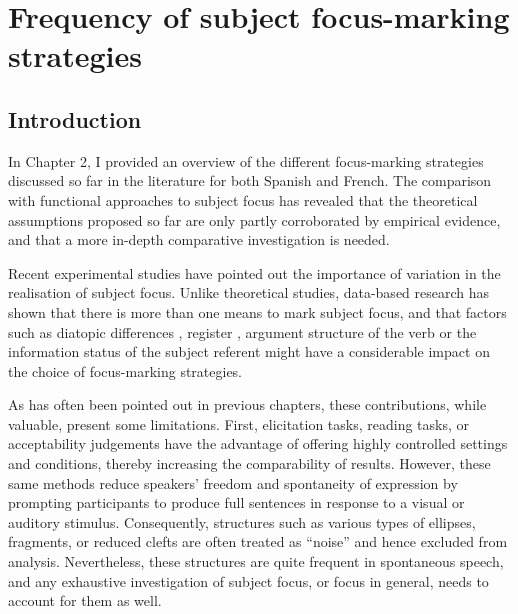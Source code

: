 
\chapter{Frequency of subject focus-marking strategies}\label{sec:3}
\section{Introduction}
In Chapter 2, I provided an overview of the different focus-marking strategies discussed so far in the literature for both Spanish and French. The comparison with functional approaches to subject focus has revealed that the theoretical assumptions proposed so far  are only partly corroborated by empirical evidence, and that a more in-depth comparative investigation is needed.

Recent experimental studies have pointed out the importance of variation in the realisation of subject focus. Unlike theoretical studies, data-based research has shown that there is more than one means to mark subject focus, and that factors such as diatopic differences \parencite{jimenez2015focus}, register \parencite{destruel2016focus}, argument structure of the verb \parencite{gabriel2007fokus} or the information status of the subject referent \parencite{karssenberg20188, karssenberg20186} might have a considerable impact on the choice of focus-marking strategies.

As has often been pointed out in previous chapters, these contributions, while valuable, present some limitations. First, elicitation tasks, reading tasks, or acceptability judgements have the advantage of offering highly controlled settings and conditions, thereby increasing the comparability of results. However, these same methods reduce speakers' freedom and spontaneity of expression by prompting participants to produce full sentences in response to a visual or auditory stimulus. Consequently, structures such as various types of ellipses, fragments, or reduced clefts are often treated as ``noise” and hence excluded from analysis. Nevertheless, these structures are quite frequent in spontaneous speech, and any exhaustive investigation of subject focus, or focus in general, needs to account for them as well.

